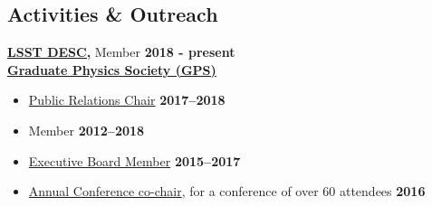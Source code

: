 \documentclass[margin]{res}
\begin{document}
\begin{resume}
\section{Activities \& Outreach} %


{\bf \href{http://www.lsst-desc.org}{LSST DESC,}} Member \hfill {\bf 2018 - present}\\
\textbf{\href{gradphysics.nd.edu}{Graduate Physics Society (GPS)}}%
\begin{itemize}\itemsep -2pt
    \item[] \href{http://gradphysics.nd.edu/about-us/committee-chairs/}{Public Relations Chair} \hfill {\bf 2017--2018}
    \item[] Member \hfill {\bf 2012--2018}
    \item[] \href{http://gradphysics.nd.edu/about-us/executive-board/}{Executive Board Member} \hfill {\bf 2015--2017}
    \item[] \href{http://gradphysics.nd.edu/conference/gpsac-2016/}{Annual Conference co-chair}, for a conference of over 60 attendees \hfill {\bf 2016}
\end{itemize} \vspace{-12pt}

\end{resume}
\end{document}
